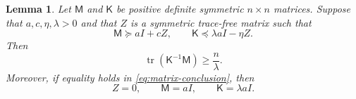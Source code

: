 \documentclass[11pt]{amsart}
\newtheorem{lemma}[theorem]{Lemma}
\theoremstyle{remark}
\DeclareMathOperator{\tr}{tr}
\newcommand{\Id}{I}
\newcommand{\mcM}{\mathsf M}
\newcommand{\mcK}{\mathsf K}
\begin{document}
\begin{lemma}\label{lem:matrix}
Let $\mcM$ and $\mcK$ be positive definite symmetric $n\times n$ matrices.  Suppose that $a,c,\eta,\lambda>0$ and that $Z$ is a symmetric trace-free matrix such that
\begin{equation}\label{eq:matrix-hyp}
        \mcM\succeq a\Id+cZ,
        \qquad
        \mcK\preceq \lambda a\Id-\eta Z.
\end{equation}
Then
\begin{equation}\label{eq:matrix-conclusion}
        \tr(\mcK^{-1}\mcM)\ge \frac{n}{\lambda}.
\end{equation}
Moreover, if equality holds in \eqref{eq:matrix-conclusion}, then
\begin{equation}\label{eq:matrix-equality-conclusion}
        Z=0,
        \qquad
        \mcM=a\Id,
        \qquad
        \mcK=\lambda a\Id.
\end{equation}
\end{lemma}
\end{document}
